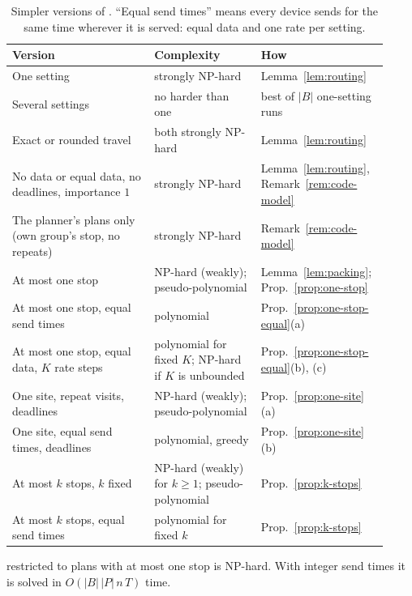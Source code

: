 \begin{table}[t]
  \centering
  \small
  \begin{tabular}{@{}p{0.36\linewidth}p{0.27\linewidth}p{0.29\linewidth}@{}}
    \toprule
    Version & Complexity & How \\
    \midrule
    One setting & strongly NP-hard & Lemma~\ref{lem:routing} \\
    Several settings & no harder than one & best of $|B|$ one-setting runs \\
    Exact or rounded travel & both strongly NP-hard & Lemma~\ref{lem:routing} \\
    No data or equal data, no deadlines, importance $1$ & strongly NP-hard & Lemma~\ref{lem:routing}, Remark~\ref{rem:code-model} \\
    The planner's plans only (own group's stop, no repeats) & strongly NP-hard & Remark~\ref{rem:code-model} \\
    \midrule
    At most one stop & NP-hard (weakly); pseudo-polynomial & Lemma~\ref{lem:packing}; Prop.~\ref{prop:one-stop} \\
    At most one stop, equal send times & polynomial & Prop.~\ref{prop:one-stop-equal}(a) \\
    At most one stop, equal data, $K$ rate steps & polynomial for fixed $K$; NP-hard if $K$ is unbounded & Prop.~\ref{prop:one-stop-equal}(b), (c) \\
    One site, repeat visits, deadlines & NP-hard (weakly); pseudo-polynomial & Prop.~\ref{prop:one-site}(a) \\
    One site, equal send times, deadlines & polynomial, greedy & Prop.~\ref{prop:one-site}(b) \\
    At most $k$ stops, $k$ fixed & NP-hard (weakly) for $k\ge1$; pseudo-polynomial & Prop.~\ref{prop:k-stops} \\
    At most $k$ stops, equal send times & polynomial for fixed $k$ & Prop.~\ref{prop:k-stops} \\
    \bottomrule
  \end{tabular}
  \caption{Simpler versions of \PLAN{}. ``Equal send times'' means every
    device sends for the same time wherever it is served: equal data and
    one rate per setting.}
  \label{tab:simpler}
\end{table}

\begin{proposition}
\label{prop:one-stop}
\PLAN{} restricted to plans with at most one stop is NP-hard. With integer
send times it is solved in $O(|B|\,|P|\,n\,T)$ time.
\end{proposition}

